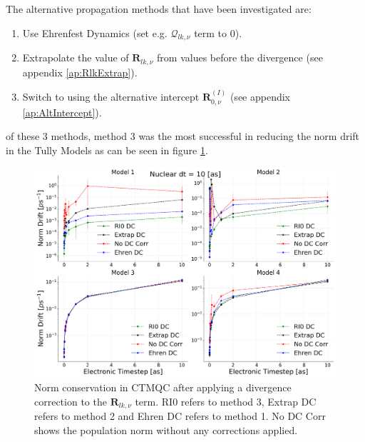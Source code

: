 \noindent The alternative propagation methods that have been investigated are:
\begin{enumerate}
	\item Use Ehrenfest Dynamics (set e.g. $\mathcal{Q}_{lk, \nu}$ term to 0).
	\item Extrapolate the value of $\mathbf{R}_{lk, \nu}$ from values before the divergence (see appendix \ref{ap:RlkExtrap}).
	\item Switch to using the alternative intercept $\mathbf{R}_{0, \nu}^{(I)}$ (see appendix \ref{ap:AltIntercept}).
\end{enumerate}
of these 3 methods, method 3 was the most successful in reducing the norm drift in the Tully Models as can be seen in figure \ref{fig:NormConsCorr}.
\begin{figure}[ht]
	\includegraphics[width=\textwidth]{../img/CTMQC/TullyModels/CTMQC_Norm_Conservation_wCorr.png}
	\caption{\label{fig:NormConsCorr}Norm conservation in CTMQC after applying a divergence correction to the $\mathbf{R}_{lk, \nu}$ term. RI0 refers to method 3, Extrap DC refers to method 2 and Ehren DC refers to method 1. No DC Corr shows the population norm without any corrections applied.}
\end{figure}
\\
